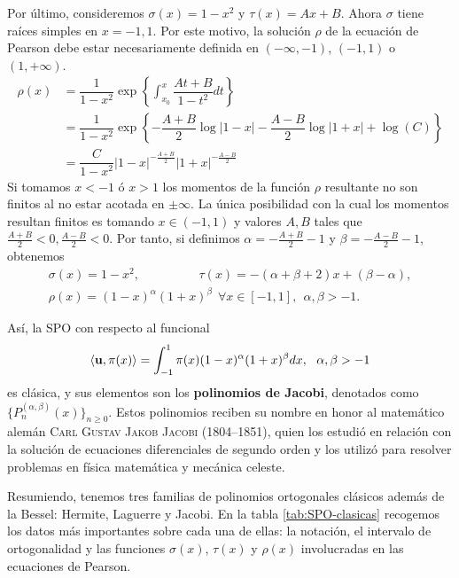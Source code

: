 Por último, consideremos $\sigma(x) = 1-x^2$ y $\tau(x)=Ax+B$. Ahora $\sigma$ tiene raíces simples en $x=-1,1$. Por este motivo, la solución $\rho$ de la ecuación de Pearson debe estar necesariamente definida en $(-\infty,-1)$, $(-1,1)$ o $(1,+\infty)$.
\begin{equation*}
    \begin{split}
        \rho(x)&=\dfrac{1}{1-x^2}\exp\left\{\int_{x_0}^x\dfrac{At+B}{1-t^2}dt\right\}\\
        &= \dfrac{1}{1-x^2}\exp\left\{-\dfrac{A+B}{2}\log|1-x|-\dfrac{A-B}{2}\log|1+x|+\log(C)\right\}\\
        &= \dfrac{C}{1-x^2}|1-x|^{-\frac{A+B}{2}}|1+x|^{-\frac{A-B}{2}}
    \end{split}
\end{equation*}
Si tomamos $x<-1$ ó $x>1$ los momentos de la función $\rho$ resultante no son finitos al no estar acotada en $\pm\infty$. La única posibilidad con la cual los momentos resultan finitos es tomando $x\in(-1,1)$ y valores $A,B$ tales que $\frac{A+B}{2}<0, \frac{A-B}{2}<0$. Por tanto, si definimos $\alpha = -\frac{A+B}{2}-1$ y $\beta=-\frac{A-B}{2}-1$, obtenemos
\begin{equation}
    \label{eq:parametros-jacobi}
    \begin{array}{c}
        \sigma(x)=1-x^2,\hspace{2cm} \tau(x)=-(\alpha+\beta+2)x+(\beta-\alpha), \\ 
        \rho(x) =(1-x)^{\alpha}(1+x)^{\beta}\ \ \forall x \in[-1,1], \ \ \alpha,\beta > -1.
    \end{array}
\end{equation}

Así, la SPO con respecto al funcional
\begin{equation}
    \label{eq:func-jacobi}
    \left\langle \mathbf{u} , \pi(x) \right\rangle = \int_{-1}^1 \pi(x)(1-x)^{\alpha}(1+x)^{\beta}dx, \ \ \alpha,\beta > -1
\end{equation}
es clásica, y sus elementos son los \textbf{polinomios de Jacobi}, denotados como $\{P_n^{(\alpha,\beta)}(x)\}_{n\geq 0}$. Estos polinomios reciben su nombre en honor al matemático alemán \textsc{Carl Gustav Jakob Jacobi} (1804--1851), quien los estudió en relación con la solución de ecuaciones diferenciales de segundo orden y los utilizó para resolver problemas en física matemática y mecánica celeste.

Resumiendo, tenemos tres familias de polinomios ortogonales clásicos además de la Bessel: Hermite, Laguerre y Jacobi. En la tabla \ref{tab:SPO-clasicas} recogemos los datos más importantes sobre cada una de ellas: la notación, el intervalo de ortogonalidad y las funciones $\sigma(x)$, $\tau(x)$ y $\rho(x)$ involucradas en las ecuaciones de Pearson.

